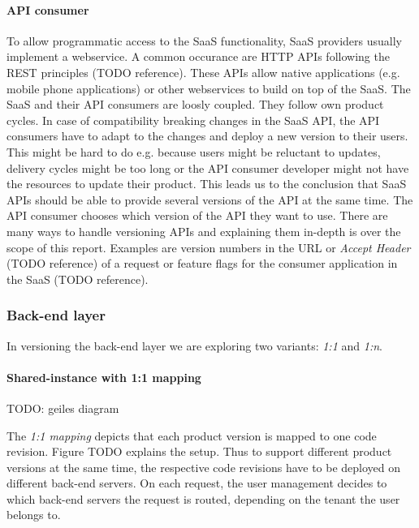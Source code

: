 \paragraph{API consumer} To allow programmatic access to the SaaS functionality, SaaS providers usually implement a webservice. A common occurance are HTTP APIs following the REST principles (TODO reference). These APIs allow native applications (e.g. mobile phone applications) or other webservices to build on top of the SaaS. The SaaS and their API consumers are loosly coupled. They follow own product cycles. In case of compatibility breaking changes in the SaaS API, the API consumers have to adapt to the changes and deploy a new version to their users. This might be hard to do e.g. because users might be reluctant to updates, delivery cycles might be too long or the API consumer developer might not have the resources to update their product. This leads us to the conclusion that SaaS APIs should be able to provide several versions of the API at the same time. The API consumer chooses which version of the API they want to use. There are many ways to handle versioning APIs and explaining them in-depth is over the scope of this report. Examples are version numbers in the URL or \emph{Accept Header} (TODO reference) of a request or feature flags for the consumer application in the SaaS (TODO reference).


\subsubsection{Back-end layer}

In versioning the back-end layer we are exploring two variants: \emph{1:1} and \emph{1:n}.

\paragraph{Shared-instance with 1:1 mapping}
TODO: geiles diagram

The \emph{1:1 mapping} depicts that each product version is mapped to one code revision. Figure TODO explains the setup. Thus to support different product versions at the same time, the respective code revisions have to be deployed on different back-end servers. On each request, the user management decides to which back-end servers the request is routed, depending on the tenant the user belongs to.

